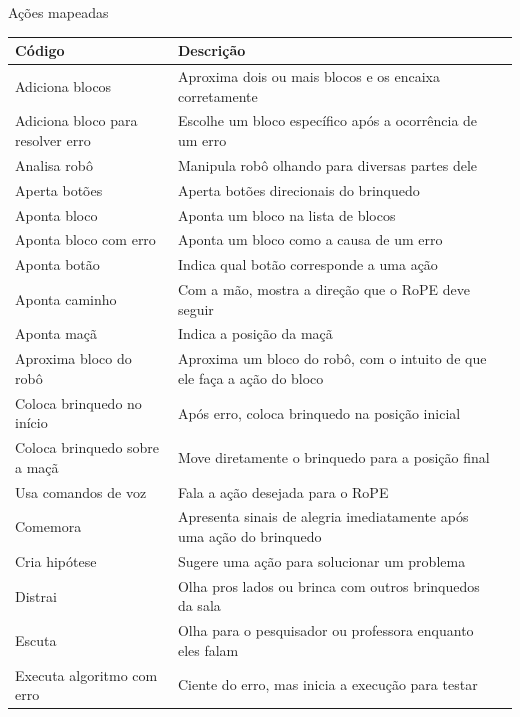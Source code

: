 \begin{quadro}[!h]
    \begin{table_env}
    \caption{Ações mapeadas}
     \label{quadro:codigos}
     \begin{tabular}{@{}l m{} c@{}}
        \toprule
        \textbf{Código} & \textbf{Descrição}  \\ \midrule
        Adiciona blocos & Aproxima dois ou mais blocos e os encaixa corretamente \\ \hline
        Adiciona bloco para resolver erro & Escolhe um bloco específico após a ocorrência de um erro \\ \hline
        Analisa robô & Manipula robô olhando para diversas partes dele \\ \hline
        Aperta botões & Aperta botões direcionais do brinquedo \\ \hline
        Aponta bloco & Aponta um bloco na lista de blocos \\ \hline
        Aponta bloco com erro & Aponta um bloco como a causa de um erro \\ \hline
        Aponta botão & Indica qual botão corresponde a uma ação \\ \hline
        Aponta caminho & Com a mão, mostra a direção que o RoPE deve seguir \\ \hline
        Aponta maçã & Indica a posição da maçã \\ \hline
        Aproxima bloco do robô & Aproxima um bloco do robô, com o intuito de que ele faça a ação do bloco \\ \hline
        Coloca brinquedo no início & Após erro, coloca brinquedo na posição inicial \\ \hline
        Coloca brinquedo sobre a maçã & Move diretamente o brinquedo para a posição final \\ \hline
        Usa comandos de voz & Fala a ação desejada para o RoPE \\ \hline
        Comemora & Apresenta sinais de alegria imediatamente após uma ação do brinquedo \\ \hline
        Cria hipótese & Sugere uma ação para solucionar um problema \\ \hline
        Distrai & Olha pros lados ou brinca com outros brinquedos da sala \\ \hline
        Escuta & Olha para o pesquisador ou professora enquanto eles falam \\ \hline
        Executa algoritmo com erro & Ciente do erro, mas inicia a execução para testar \\ \hline

\end{tabular}
\end{table_env}
\end{quadro}
